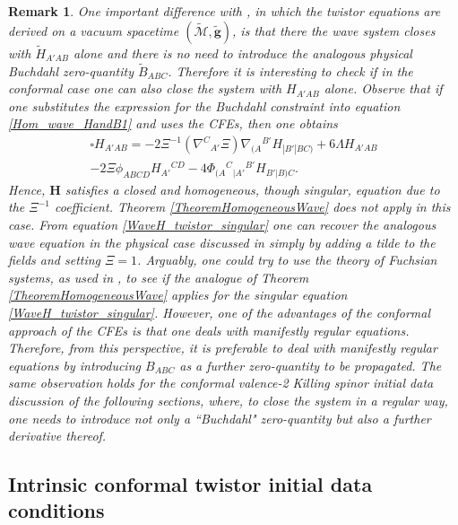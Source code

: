 \documentclass[10pt,a4paper]{article}
\theoremstyle{plain}
\newtheorem{remark}{Remark}
\def\bmg{{\bm g}}
\def\bmH{{\bm H}}
\begin{document}
\begin{remark}
\em{One important difference with \cite{GarVal08c}, in which the twistor equations are derived on a vacuum spacetime $(\tilde{\mathcal{M}},\tilde{\bmg})$, is that there the wave system
  closes with $\tilde{H}_{A'AB}$ alone and there is no need to
  introduce the analogous physical Buchdahl zero-quantity
  $\tilde{B}_{ABC}$.  Therefore it is interesting to check if in the
  conformal case one can also close the system with $H_{A'AB}$ alone.
  Observe that if one substitutes the expression for the Buchdahl
  constraint into equation \eqref{Hom_wave_HandB1} and uses the CFEs, then 
  one obtains
\begin{multline}\label{WaveH_twistor_singular}
  \square H_{A'AB} = - 2\Xi^{-1} (\nabla^{C}{}_{A'}\Xi)
  \nabla_{(A}{}^{B'}H_{|B'|BC)}+ 6 \Lambda H_{A'AB} \\-2 \Xi \phi
  _{ABCD}H_{A'}{}^{CD} -4 \Phi_{(A}{}^{C}{}_{|A'}{}^{B'}H_{B'|B)C}.
 \end{multline}
Hence, $\bmH$ satisfies a closed and homogeneous, though \emph{singular}, equation
due to the $\Xi^{-1}$ coefficient. Theorem
\ref{TheoremHomogeneousWave} does not apply in this case.  From equation
\eqref{WaveH_twistor_singular} one can recover the analogous wave
equation in the physical case discussed in \cite{GarVal08c} simply by
adding a tilde to the fields and setting $\Xi=1$. Arguably, one could try to use the theory of \textit{Fuchsian 
  systems}, as used in \cite{ChrPae13a,Pae14a}, to see if the
analogue of Theorem \ref{TheoremHomogeneousWave} applies for the
singular equation \eqref{WaveH_twistor_singular}.  However, one of the
advantages of the conformal approach of the CFEs is that one deals
with manifestly regular equations.  Therefore, from this perspective,
it is preferable to deal with manifestly regular equations by introducing $B_{ABC}$ as a further
zero-quantity to be propagated.  The same observation holds for the
conformal valence-2 Killing spinor initial data discussion of the
following sections, where, to close the system in a regular way, one
needs to introduce not only a ``Buchdahl" zero-quantity but also a
further derivative thereof.}
\end{remark}


\subsection{Intrinsic conformal twistor initial data conditions}
\label{Sec:IntrinsicTwistor}
\end{document}
